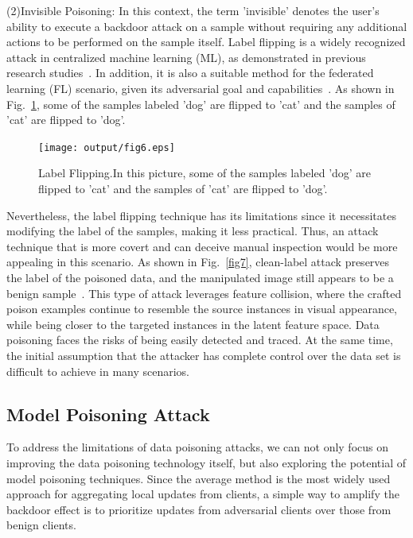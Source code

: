 (2)Invisible Poisoning: In this context, the term 
'invisible' denotes the user's ability to execute a backdoor attack
on a sample without requiring any additional actions to
be performed on the sample itself. Label flipping is a widely recognized attack in
centralized machine learning (ML), as demonstrated in previous
research studies~\cite{shen2016auror,steinhardt2017certified}. In addition, it is also a suitable
method for the federated learning (FL) scenario, given its
adversarial goal and capabilities~\cite{tolpegin2020data}. As shown in Fig.~\ref{fig6},
some of the samples labeled 'dog' are flipped to 'cat' and
the samples of 'cat' are flipped to 'dog'.  

\begin{figure}[h]
    \centering
    \texttt{[image: output/fig6.eps]}
     \caption{Label Flipping.In this picture, some of the samples labeled
     'dog' are flipped to 'cat' and the samples of 'cat' are flipped to 'dog'.}
     \label{fig6}
\end{figure}

Nevertheless, the label flipping technique has its
limitations since it necessitates modifying the label of the
samples, making it less practical. Thus, an attack technique
that is more covert and can deceive manual inspection
would be more appealing in this scenario. As shown in
Fig.~\ref{fig7}, clean-label attack preserves the label of the poisoned
data, and the manipulated image still appears to be a
benign sample~\cite{shafahi2018poison,zhu2019transferable}. This type of attack leverages feature
collision, where the crafted poison examples continue to
resemble the source instances in visual appearance, while
being closer to the targeted instances in the latent feature
space. Data poisoning faces the risks of being easily detected
and traced. At the same time, the initial assumption that
the attacker has complete control over the data set is
diﬀicult to achieve in many scenarios. 

\subsection{Model Poisoning Attack}
To address the limitations of data poisoning attacks,
we can not only focus on improving the data poisoning
technology itself, but also exploring the potential of model
poisoning techniques. Since the average method is the
most widely used approach for aggregating local updates
from clients, a simple way to amplify the backdoor effect
is to prioritize updates from adversarial clients over those
from benign clients. 

